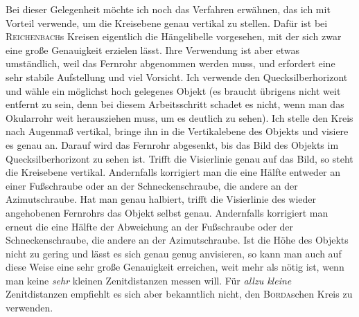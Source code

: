 \par\indent Bei dieser Gelegenheit möchte ich noch das Verfahren erwähnen, das ich mit Vorteil verwende, um die Kreisebene genau vertikal zu stellen. Dafür ist bei \textsc{Reichenbach}s Kreisen eigentlich die Hängelibelle vorgesehen, mit der sich zwar eine große Genauigkeit erzielen lässt. Ihre Verwendung ist aber etwas umständlich, weil das Fernrohr abgenommen werden muss, und erfordert eine sehr stabile Aufstellung und viel Vorsicht. Ich verwende den Quecksilberhorizont und wähle ein möglichst hoch gelegenes Objekt (es braucht übrigens nicht weit entfernt zu sein, denn bei diesem Arbeitsschritt schadet es nicht, wenn man das Okularrohr weit herausziehen muss, um es deutlich zu sehen). Ich stelle den Kreis nach Augenmaß vertikal, bringe ihn in die Vertikalebene des Objekts und visiere es genau an. Darauf wird das Fernrohr abgesenkt, bis das Bild des Objekts im Quecksilberhorizont zu sehen ist. Trifft die Visierlinie genau auf das Bild, so steht die Kreisebene vertikal. Andernfalls korrigiert man die eine Hälfte entweder an einer Fußschraube oder an der Schneckenschraube, die andere an der Azimutschraube. Hat man genau halbiert, trifft die Visierlinie des wieder angehobenen Fernrohrs das Objekt selbst genau. Andernfalls korrigiert man erneut die eine Hälfte der Abweichung an der Fußschraube oder der Schneckenschraube, die andere an der Azimutschraube. Ist die Höhe des Objekts nicht zu gering und lässt es sich genau genug anvisieren, so kann man auch auf diese Weise eine sehr große Genauigkeit erreichen, weit mehr als nötig ist, wenn man keine \emph{sehr} kleinen Zenitdistanzen messen will. Für \emph{allzu kleine} Zenitdistanzen empfiehlt es sich aber bekanntlich nicht, den \textsc{Borda}schen Kreis zu verwenden.

